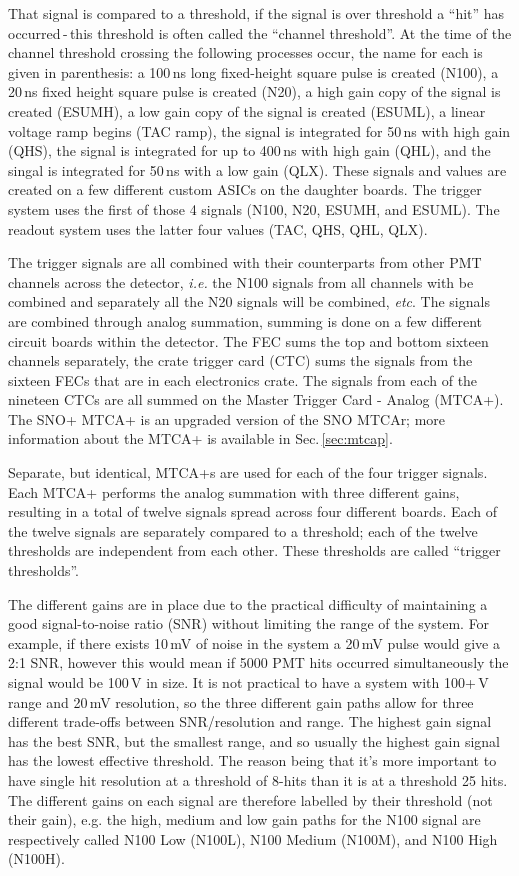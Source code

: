That signal is compared to a threshold, if the signal is over threshold a ``hit''
has occurred\,-\,this threshold is often called the ``channel threshold''.
At the time of the channel threshold crossing the following processes occur, the name for each is given
in parenthesis:
a 100\,ns long fixed-height square pulse is created (N100), a 20\,ns fixed height square pulse is created (N20),
a high gain copy of the signal is created (ESUMH), a low gain copy of the signal
is created (ESUML), a linear voltage ramp begins (TAC ramp), the signal is integrated for
50\,ns with high gain (QHS), the signal is integrated for up to 400\,ns with high gain (QHL),
and the singal is integrated for 50\,ns with a low gain (QLX).
These signals and values are created on a few different custom ASICs on the
daughter boards.
The trigger system uses the first of those 4 signals (N100, N20, ESUMH, and ESUML).
The readout system uses the latter four values (TAC, QHS, QHL, QLX).

The trigger signals are all combined with their counterparts from
other PMT channels across the detector, \textit{i.e.} the N100 signals
from all channels with be combined and separately all the
N20 signals will be combined, \textit{etc}.
The signals are combined through analog summation, summing is done on a few different
circuit boards within the detector.
The FEC sums the top and bottom sixteen channels separately, the crate
trigger card (CTC) sums the signals from the sixteen
FECs that are in each electronics crate.
The signals from each of the nineteen CTCs are all summed on the
Master Trigger Card - Analog (MTCA+). The SNO+ MTCA+ is an upgraded
version of the SNO MTCAr; more information about the MTCA+ is available in
Sec.\,\ref{sec:mtcap}.

Separate, but identical, MTCA+s are used for each of the four trigger signals.
Each MTCA+ performs the analog summation with three different gains,
resulting in a total of twelve signals spread across four different boards.
Each of the twelve signals are separately compared to a threshold;
each of the twelve thresholds are independent from each other.
These thresholds are called ``trigger thresholds''.

The different gains are in place due to the practical difficulty of maintaining
a good signal-to-noise ratio (SNR) without limiting the range of the
system.
For example, if there exists 10\,mV of noise in the system a 20\,mV pulse
would give a 2:1 SNR, however this would mean if 5000 PMT hits occurred simultaneously
the signal would be 100\,V in size.
It is not practical to have a system with 100+\,V range and 20\,mV resolution,
so the three different gain paths allow for three different trade-offs between
SNR/resolution and range.
The highest gain signal has the best SNR, but the smallest range, and so usually
the highest gain signal has the lowest effective threshold.
The reason being that it's more important to have single hit resolution at a threshold
of 8-hits than it is at a threshold 25 hits.
The different gains on each signal are therefore labelled by their threshold (not their gain), e.g.
the high, medium and low gain paths for the N100 signal are respectively called
N100 Low (N100L), N100 Medium (N100M), and N100 High (N100H).

